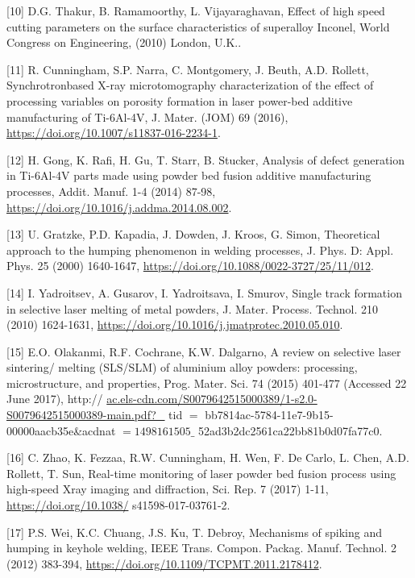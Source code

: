 \documentclass[10pt]{article}
\begin{document}
[10] D.G. Thakur, B. Ramamoorthy, L. Vijayaraghavan, Effect of high speed cutting parameters on the surface characteristics of superalloy Inconel, World Congress on Engineering, (2010) London, U.K..

[11] R. Cunningham, S.P. Narra, C. Montgomery, J. Beuth, A.D. Rollett, Synchrotronbased X-ray microtomography characterization of the effect of processing variables on porosity formation in laser power-bed additive manufacturing of Ti-6Al-4V, J. Mater. (JOM) 69 (2016), \href{https://doi.org/10.1007/s11837-016-2234-1}{https://doi.org/10.1007/s11837-016-2234-1}.

[12] H. Gong, K. Rafi, H. Gu, T. Starr, B. Stucker, Analysis of defect generation in Ti-6Al-4V parts made using powder bed fusion additive manufacturing processes, Addit. Manuf. 1-4 (2014) 87-98, \href{https://doi.org/10.1016/j.addma.2014.08.002}{https://doi.org/10.1016/j.addma.2014.08.002}.

[13] U. Gratzke, P.D. Kapadia, J. Dowden, J. Kroos, G. Simon, Theoretical approach to the humping phenomenon in welding processes, J. Phys. D: Appl. Phys. 25 (2000) 1640-1647, \href{https://doi.org/10.1088/0022-3727/25/11/012}{https://doi.org/10.1088/0022-3727/25/11/012}.

[14] I. Yadroitsev, A. Gusarov, I. Yadroitsava, I. Smurov, Single track formation in selective laser melting of metal powders, J. Mater. Process. Technol. 210 (2010) 1624-1631, \href{https://doi.org/10.1016/j.jmatprotec.2010.05.010}{https://doi.org/10.1016/j.jmatprotec.2010.05.010}.

[15] E.O. Olakanmi, R.F. Cochrane, K.W. Dalgarno, A review on selective laser sintering/ melting (SLS/SLM) of aluminium alloy powders: processing, microstructure, and properties, Prog. Mater. Sci. 74 (2015) 401-477 (Accessed 22 June 2017), http:// \href{http://ac.els-cdn.com/S0079642515000389/1-s2.0-S0079642515000389-main.pdf?_}{ac.els-cdn.com/S0079642515000389/1-s2.0-S0079642515000389-main.pdf?\_} tid $=$ bb7814ac-5784-11e7-9b15-00000aacb35e\&acdnat $=1498161505 \_$ 52ad3b2dc2561ca22bb81b0d07fa77c0.

[16] C. Zhao, K. Fezzaa, R.W. Cunningham, H. Wen, F. De Carlo, L. Chen, A.D. Rollett, T. Sun, Real-time monitoring of laser powder bed fusion process using high-speed Xray imaging and diffraction, Sci. Rep. 7 (2017) 1-11, \href{https://doi.org/10.1038/}{https://doi.org/10.1038/} s41598-017-03761-2.

[17] P.S. Wei, K.C. Chuang, J.S. Ku, T. Debroy, Mechanisms of spiking and humping in keyhole welding, IEEE Trans. Compon. Packag. Manuf. Technol. 2 (2012) 383-394, \href{https://doi.org/10.1109/TCPMT.2011.2178412}{https://doi.org/10.1109/TCPMT.2011.2178412}.
\end{document}
